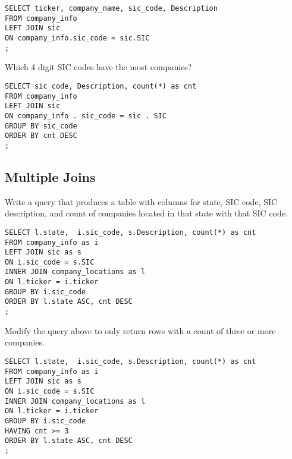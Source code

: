 \documentclass[10pt]{exam}
\begin{document}
\begin{questions}
\begin{solution}
\begin{lstlisting}
SELECT ticker, company_name, sic_code, Description
FROM company_info
LEFT JOIN sic
ON company_info.sic_code = sic.SIC
;
\end{lstlisting}
\end{solution}

\question Which 4 digit SIC codes have the most companies?

\begin{solution}
\begin{lstlisting}
SELECT sic_code, Description, count(*) as cnt
FROM company_info
LEFT JOIN sic
ON company_info . sic_code = sic . SIC
GROUP BY sic_code
ORDER BY cnt DESC
;
\end{lstlisting}
\end{solution}


\subsection*{Multiple Joins}

\question Write a query that produces a table with columns for state, SIC
code, SIC description, and count of companies located in that state
with that SIC code.

\begin{solution}
\begin{lstlisting}
SELECT l.state,  i.sic_code, s.Description, count(*) as cnt
FROM company_info as i
LEFT JOIN sic as s
ON i.sic_code = s.SIC
INNER JOIN company_locations as l
ON l.ticker = i.ticker
GROUP BY i.sic_code
ORDER BY l.state ASC, cnt DESC
;
\end{lstlisting}
\end{solution}


\question Modify the query above to only return rows with a count
of three or more companies.

\begin{solution}
\begin{lstlisting}
SELECT l.state,  i.sic_code, s.Description, count(*) as cnt
FROM company_info as i
LEFT JOIN sic as s
ON i.sic_code = s.SIC
INNER JOIN company_locations as l
ON l.ticker = i.ticker
GROUP BY i.sic_code
HAVING cnt >= 3
ORDER BY l.state ASC, cnt DESC
;
\end{lstlisting}
\end{solution}



%

\end{questions}
\end{document}
